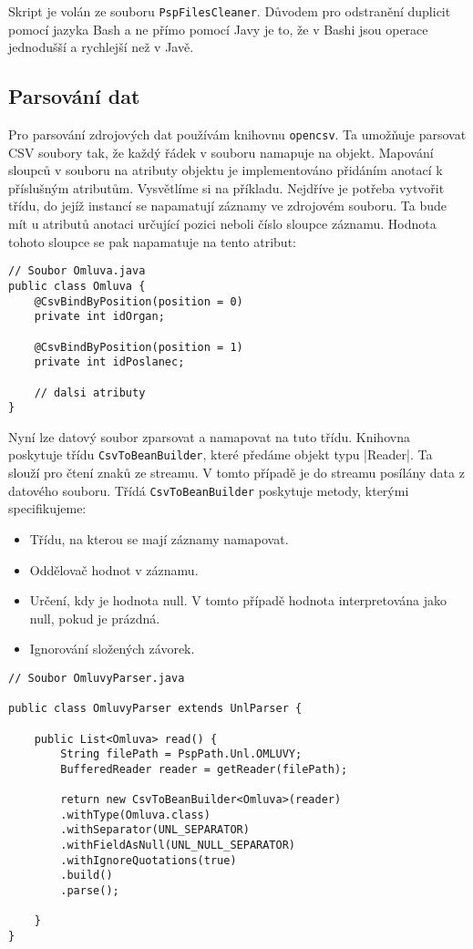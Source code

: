 \noindent Skript je volán ze souboru \lstinline|PspFilesCleaner|. Důvodem pro odstranění duplicit pomocí jazyka Bash a ne přímo pomocí Javy je to, že v Bashi jsou operace jednodušší a rychlejší než v Javě. 

\subsection{Parsování dat}
Pro parsování zdrojových dat používám knihovnu \lstinline|opencsv|. Ta umožňuje parsovat CSV soubory tak, že každý řádek v souboru namapuje na objekt. Mapování sloupců v souboru na atributy objektu je implementováno přidáním anotací k příslušným atributům. Vysvětlíme si na příkladu. Nejdříve je potřeba vytvořit třídu, do jejíž instancí se napamatují záznamy ve zdrojovém souboru. Ta bude mít u atributů anotaci určující pozici neboli číslo sloupce záznamu. Hodnota tohoto sloupce se pak napamatuje na tento atribut:

\begin{lstlisting}[caption={Parsování datového souboru omluvy.unl}, tabsize=2]
// Soubor Omluva.java
public class Omluva {
	@CsvBindByPosition(position = 0)
	private int idOrgan;
	
	@CsvBindByPosition(position = 1)
	private int idPoslanec;

	// dalsi atributy	
}
\end{lstlisting}

\noindent Nyní lze datový soubor zparsovat a namapovat na tuto třídu. Knihovna poskytuje třídu \lstinline|CsvToBeanBuilder|, které předáme objekt typu |Reader|. Ta slouží pro čtení znaků ze streamu. V tomto případě je do streamu posílány data z datového souboru. Třídá \lstinline|CsvToBeanBuilder| poskytuje metody, kterými specifikujeme:

\begin{itemize}
	\item Třídu, na kterou se mají záznamy namapovat.
	\item Oddělovač hodnot v záznamu.
	\item Určení, kdy je hodnota null. V tomto případě hodnota interpretována jako null, pokud je prázdná.
	\item Ignorování složených závorek.
\end{itemize}

\begin{lstlisting}[caption={Parsování datového souboru omluvy.unl}, tabsize=2]
// Soubor OmluvyParser.java
	
public class OmluvyParser extends UnlParser {
	
	public List<Omluva> read() {
		String filePath = PspPath.Unl.OMLUVY;
		BufferedReader reader = getReader(filePath);
		
		return new CsvToBeanBuilder<Omluva>(reader)
		.withType(Omluva.class)
		.withSeparator(UNL_SEPARATOR)
		.withFieldAsNull(UNL_NULL_SEPARATOR)
		.withIgnoreQuotations(true)
		.build()
		.parse();
		
	}
}
	
\end{lstlisting}


